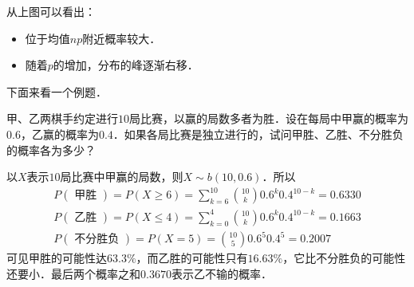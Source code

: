 从上图可以看出：
\begin{itemize}
\item 位于均值$np$附近概率较大．
\item 随着$p $的增加，分布的峰逐渐右移．
\end{itemize}

下面来看一个例题．
\begin{example}{}
甲、乙两棋手约定进行$10 $局比赛，以赢的局数多者为胜．设在每局中甲赢的概率为$0.6$，乙赢的概率为$0. 4$．如果各局比赛是独立进行的，试问甲胜、乙胜、不分胜负的概率各为多少？

以$X $表示$10 $局比赛中甲赢的局数，则$X\sim b(10,0. 6)$．所以
\begin{equation}
\begin{aligned}P(\text { 甲胜 })=P(X \geqslant 6)=\sum_{k=6}^{10}\binom{10}{k} 0.6^{k} 0.4^{10-k}=0.6330 \\ P(\text { 乙胜 })=P(X \leqslant 4)=\sum_{k=0}^{4}\binom{10}{k} 0.6^{k} 0.4^{10-k}=0.1663 \\ P(\text { 不分胜负 })=P(X=5)=\binom{10}{5} 0.6^{5} 0.4^{5}=0.2007\end{aligned}
\end{equation}
可见甲胜的可能性达$63. 3\%$，而乙胜的可能性只有$16. 63\% $，它比不分胜负的可能性还要小．最后两个概率之和$0. 367 0 $表示乙不输的概率．
\end{example}